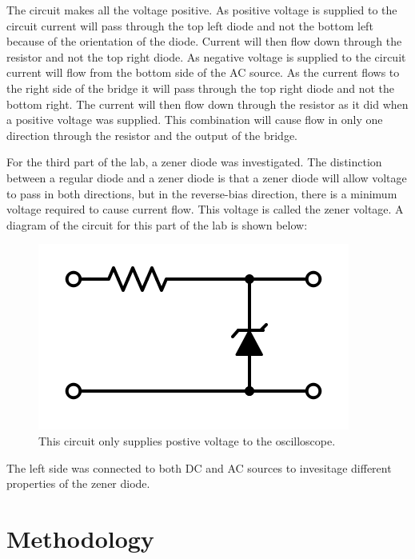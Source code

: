 \documentclass[twocolumn, amsmath]{revtex4}
\begin{document}
The circuit makes all the voltage positive. As positive voltage is supplied to the circuit current will pass through the top left diode and not the bottom left because of the orientation of the diode. Current will then flow down through the resistor and not the top right diode. As negative voltage is supplied to the circuit current will flow from the bottom side of the AC source. As the current flows to the right side of the bridge it will pass through the top right diode and not the bottom right. The current will then flow down through the resistor as it did when a positive voltage was supplied. This combination will cause flow in only one direction through the resistor and the output of the bridge.

For the third part of the lab, a zener diode was investigated. The distinction between a regular diode and a zener diode is that a zener diode will allow voltage to pass in both directions, but in the reverse-bias direction, there is a minimum voltage required to cause current flow. This voltage is called the zener voltage. A diagram of the circuit for this part of the lab is shown below:

\begin{figure}
    \includegraphics[scale=0.3]{zener.png}  
    \caption{This circuit only supplies postive voltage to the oscilloscope.}
\end{figure}

The left side was connected to both DC and AC sources to invesitage different properties of the zener diode. 





\section{Methodology}
\end{document}
